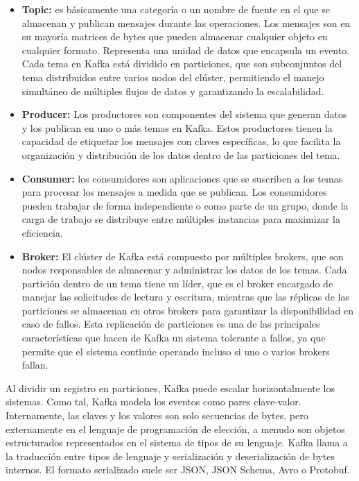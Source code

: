 \documentclass{article}
\begin{document}
\begin{itemize}
    \item \textbf{Topic: }es básicamente una categoría o un nombre de fuente en el que se almacenan y publican mensajes durante las operaciones. Los mensajes son en su mayoría matrices de bytes que pueden almacenar cualquier objeto en cualquier formato. Representa una unidad de datos que encapsula un evento. Cada tema en Kafka está dividido en particiones, que son subconjuntos del tema distribuidos entre varios nodos del clúster, permitiendo el manejo simultáneo de múltiples flujos de datos y garantizando la escalabilidad.
    \item \textbf{Producer: }Los productores son componentes del sistema que generan datos y los publican en uno o más temas en Kafka. Estos productores tienen la capacidad de etiquetar los mensajes con claves específicas, lo que facilita la organización y distribución de los datos dentro de las particiones del tema.
    \item \textbf{Consumer: } los consumidores son aplicaciones que se suscriben a los temas para procesar los mensajes a medida que se publican. Los consumidores pueden trabajar de forma independiente o como parte de un grupo, donde la carga de trabajo se distribuye entre múltiples instancias para maximizar la eficiencia.
    \item \textbf{Broker: }El clúster de Kafka está compuesto por múltiples brokers, que son nodos responsables de almacenar y administrar los datos de los temas. Cada partición dentro de un tema tiene un líder, que es el broker encargado de manejar las solicitudes de lectura y escritura, mientras que las réplicas de las particiones se almacenan en otros brokers para garantizar la disponibilidad en caso de fallos. Esta replicación de particiones es una de las principales características que hacen de Kafka un sistema tolerante a fallos, ya que permite que el sistema continúe operando incluso si uno o varios brokers fallan.

\end{itemize}

Al dividir un registro en particiones, Kafka puede escalar horizontalmente los sistemas. Como tal, Kafka modela los eventos como pares clave-valor. Internamente, las claves y los valores son solo secuencias de bytes, pero externamente en el lenguaje de programación de elección, a menudo son objetos estructurados representados en el sistema de tipos de su lenguaje. Kafka llama a la traducción entre tipos de lenguaje y serialización y deserialización de bytes internos. El formato serializado suele ser JSON, JSON Schema, Avro o Protobuf.
\end{document}

